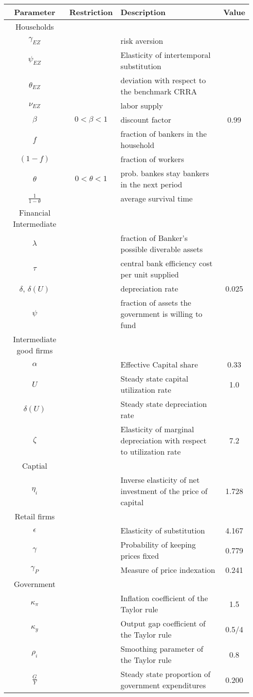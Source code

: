 \documentclass[document.tex]{subfiles}
\begin{document}
\begin{table}[H]
\begin{tabular}{cclc}
\toprule
Parameter & Restriction & Description & Value\\ \hline
Households & & & \\
 $\gamma_{EZ}$& &risk aversion  & \\
 $\psi_{EZ}$& &Elasticity of intertemporal substitution & \\
 $\theta_{EZ}$ &&deviation with respect to the benchmark CRRA& \\
 $\nu_{EZ}$ & & labor supply & \\
$\beta$ 	& $0<\beta<1$	& discount factor & 0.99\\
$f$ 			& 		& fraction of bankers in the household & \\
$(1-f)$		&							& fraction of workers & \\
$\theta$	&$0<\theta<1$	&prob. bankes stay bankers in the next period & \\
$\frac{1}{1-\theta}$&		&average survival time & \\	
Financial Intermediate & & & \\
$\lambda$& & fraction of Banker's possible diverable assets & \\
$\tau$& &central bank efficiency cost per unit supplied& \\
$\delta$, $\delta (U)$& &depreciation rate&0.025 \\
$\psi$& & fraction of assets the government is willing to fund & \\
Intermediate good firms& & & \\
$\alpha$& &Effective Capital share &0.33 \\
$U$& &Steady state capital utilization rate & 1.0 \\
$\delta(U)$& &Steady state depreciation rate & \\
$\zeta$& &Elasticity of marginal depreciation with respect to utilization rate & 7.2 \\
Captial & & & \\
$\eta_i$& &Inverse elasticity of net investment of the price of capital & 1.728 \\
Retail firms & & & \\
$\epsilon$& &Elasticity of substitution & 4.167\\
$\gamma$& &Probability of keeping prices fixed & 0.779\\
$\gamma_P$& &Measure of price indexation & 0.241\\
Government & & & \\
$\kappa_{\pi}$& &Inflation coefficient of the Taylor rule & 1.5\\
$\kappa_{y}$& &Output gap coefficient of the Taylor rule & 0.5/4\\
$\rho_i$& &Smoothing parameter of the Taylor rule &0.8 \\
$\frac{G}{Y}$& &Steady state proportion of government expenditures & 0.200 \\
\bottomrule 				
\end{tabular}
\end{table}
\end{document}
